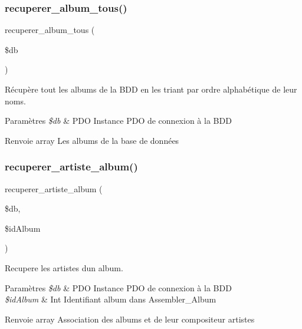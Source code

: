\subsubsection{\texorpdfstring{recuperer\+\_\+album\+\_\+tous()}{recuperer\_album\_tous()}}
{\footnotesize\ttfamily recuperer\+\_\+album\+\_\+tous (\begin{DoxyParamCaption}\item[{}]{\$db }\end{DoxyParamCaption})}



Récupère tout les albums de la B\+DD en les triant par ordre alphabétique de leur noms. 


\begin{DoxyParams}{Paramètres}
{\em \$db} & P\+DO Instance P\+DO de connexion à la B\+DD \\
\hline
\end{DoxyParams}
\begin{DoxyReturn}{Renvoie}
array Les albums de la base de données 
\end{DoxyReturn}
\mbox{\label{fonctionAlbum_8php_a00cf2b1cbba7f0a49fd987ce8698e5b8}} 
\subsubsection{\texorpdfstring{recuperer\+\_\+artiste\+\_\+album()}{recuperer\_artiste\_album()}}
{\footnotesize\ttfamily recuperer\+\_\+artiste\+\_\+album (\begin{DoxyParamCaption}\item[{}]{\$db,  }\item[{}]{\$id\+Album }\end{DoxyParamCaption})}



Recupere les artistes d\textquotesingle{}un album. 


\begin{DoxyParams}{Paramètres}
{\em \$db} & P\+DO Instance P\+DO de connexion à la B\+DD \\
\hline
{\em \$id\+Album} & Int Identifiant album dans Assembler\+\_\+\+Album \\
\hline
\end{DoxyParams}
\begin{DoxyReturn}{Renvoie}
array Association des albums et de leur compositeur artistes 
\end{DoxyReturn}
\mbox{\label{fonctionAlbum_8php_a440a43eada75aa71f51ce4512d654a87}} 
